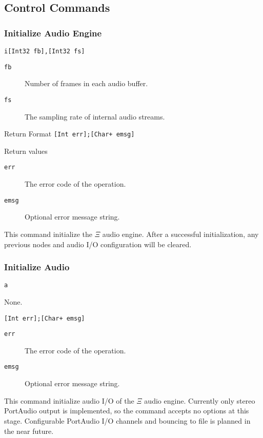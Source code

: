 \documentclass{report}
\newcommand{\Ksi}{$\Xi$ }
\newcommand{\inlinecode}[1]{\begin{mdframed}[backgroundcolor=black!10]#1\end{mdframed}}
\begin{document}
\subsection{Control Commands}\label{sec:rpc}
\subsubsection{Initialize Audio Engine}
\inlinecode{
\begin{description}\sloppy
\item[Command Format] \lstinline{i[Int32 fb],[Int32 fs]}
\item[Command Arguments]\hfill
  \begin{description}
  \item[\texttt{fb}] Number of frames in each audio buffer.
  \item[\texttt{fs}] The sampling rate of internal audio streams.
  \end{description}
\item[Return Format] \lstinline|[Int err];[Char+ emsg]|
\item[Return values]\hfill
  \begin{description}
  \item[\texttt{err}] The error code of the operation.
  \item[\texttt{emsg}] Optional error message string.
  \end{description}
\end{description}}\par
This command initialize the \Ksi audio engine. After a successful initialization, any previous nodes and audio I/O configuration will be cleared.
\subsubsection{Initialize Audio}
\inlinecode{
\begin{description}\sloppy
\item[Command Format] \lstinline{a}
\item[Command Arguments] None.
\item[Return Format] \lstinline|[Int err];[Char+ emsg]|
\item[Return values]\hfill
  \begin{description}
  \item[\texttt{err}] The error code of the operation.
  \item[\texttt{emsg}] Optional error message string.
  \end{description}
\end{description}}\par
This command initialize audio I/O of the \Ksi audio engine. Currently only stereo PortAudio output is implemented, so the command accepts no options at this stage. Configurable PortAudio I/O channels and bouncing to file is planned in the near future.
\end{document}
